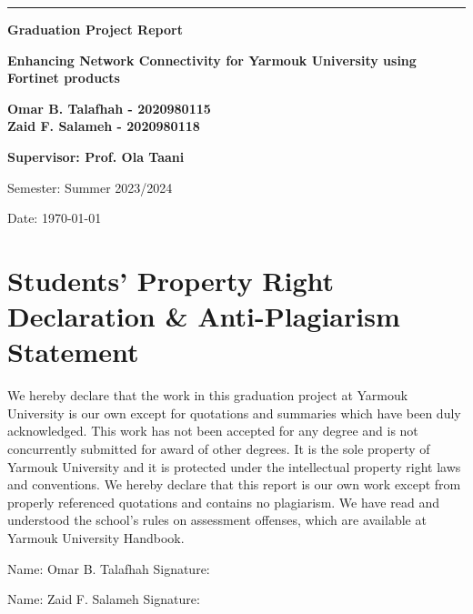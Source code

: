 \documentclass[12pt]{report}
\begin{document}
\begin{titlepage}
\thispagestyle{firstpage} %

   \vspace*{1.5cm} %
    \noindent\textcolor{darkred}{\rule{15.5cm}{1mm}}
    \vspace{2cm}
   \begin{center}
  
       {\Large\bfseries Graduation Project Report\par}
   \vspace{2cm} %
   {\huge\bfseries Enhancing Network Connectivity for Yarmouk University using Fortinet products\par}
   \vspace{2cm} %
   {\large\bfseries Omar B. Talafhah - 2020980115 \\ 
   Zaid F. Salameh - 2020980118 \par}
   \vspace{0.5cm}
   {\large\bfseries Supervisor: Prof. Ola Taani\par}
   \vfill %
   Semester: Summer 2023/2024\par
   Date: \today
   \end{center}
   \thispagestyle{firstpage} 
\end{titlepage}

\newpage
\section*{Students' Property Right Declaration \& Anti-Plagiarism Statement}

We hereby declare that the work in this graduation project at Yarmouk University is our own except for quotations and summaries which have been duly acknowledged. This work has not been accepted for any degree and is not concurrently submitted for award of other degrees. It is the sole property of Yarmouk University and it is protected under the intellectual property right laws and conventions. We hereby declare that this report is our own work except from properly referenced quotations and contains no plagiarism. We have read and understood the school's rules on assessment offenses, which are available at Yarmouk University Handbook.
\begin{center}
\vspace{1cm}
Name: Omar B. Talafhah \hspace{3cm} Signature: 

Name: Zaid F. Salameh  \hspace{3.3cm} Signature: 


\end{center}
\end{document}

